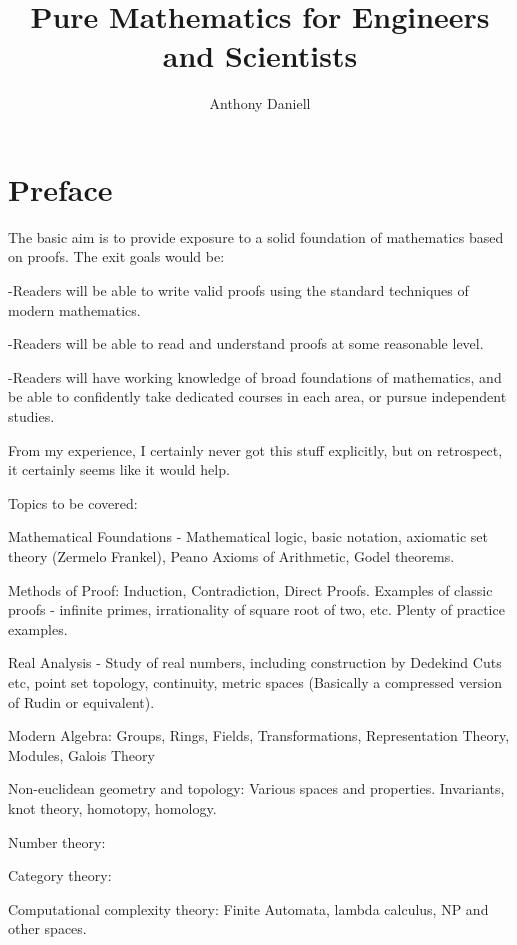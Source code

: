 \documentclass{book}
\title{Pure Mathematics for Engineers and Scientists}
\author{Anthony Daniell}
\begin{document}
\maketitle 


\chapter*{Preface}


The basic aim is to provide exposure to a solid foundation of mathematics based on proofs.  The exit goals would be:

-Readers will be able to write valid proofs using the standard techniques of modern mathematics.

-Readers will be able to read and understand proofs at some reasonable level.

-Readers will have working knowledge of broad foundations of mathematics, and be able to confidently take dedicated courses in each area, or pursue independent studies.
    
    
From my experience, I certainly never got this stuff explicitly, but on retrospect, it certainly seems like it would help.     


Topics to be covered:

    Mathematical Foundations - Mathematical logic, basic notation, axiomatic set theory (Zermelo Frankel), Peano Axioms of Arithmetic, Godel theorems.


    Methods of Proof:  Induction, Contradiction, Direct Proofs.  Examples of classic proofs - infinite primes, irrationality of square root of two, etc.  Plenty of practice examples.


    Real Analysis - Study of real numbers, including construction by Dedekind Cuts etc, point set topology, continuity, metric spaces (Basically a compressed version of Rudin or equivalent).


    Modern Algebra:  Groups, Rings, Fields, Transformations, Representation Theory, Modules, Galois Theory


    Non-euclidean geometry and topology:  Various spaces and properties.  Invariants, knot theory, homotopy, homology.


    Number theory:


    Category theory:


    Computational complexity theory:  Finite Automata, lambda calculus, NP and other spaces.
    
\tableofcontents




\end{document}

